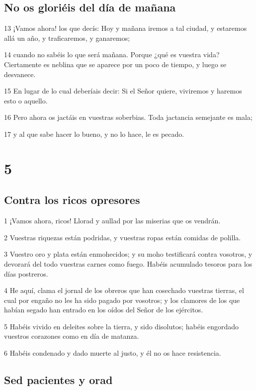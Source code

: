\section*{No os gloriéis del día de mañana}

\par 13 ¡Vamos ahora! los que decís: Hoy y mañana iremos a tal ciudad, y estaremos allá un año, y traficaremos, y ganaremos;
\par 14 cuando no sabéis lo que será mañana. Porque ¿qué es vuestra vida? Ciertamente es neblina que se aparece por un poco de tiempo, y luego se desvanece.
\par 15 En lugar de lo cual deberíais decir: Si el Señor quiere, viviremos y haremos esto o aquello.
\par 16 Pero ahora os jactáis en vuestras soberbias. Toda jactancia semejante es mala;
\par 17 y al que sabe hacer lo bueno, y no lo hace, le es pecado.

\chapter{5}

\section*{Contra los ricos opresores}

\par 1 ¡Vamos ahora, ricos! Llorad y aullad por las miserias que os vendrán.
\par 2 Vuestras riquezas están podridas, y vuestras ropas están comidas de polilla.
\par 3 Vuestro oro y plata están enmohecidos; y su moho testificará contra vosotros, y devorará del todo vuestras carnes como fuego. Habéis acumulado tesoros para los días postreros.
\par 4 He aquí, clama el jornal de los obreros que han cosechado vuestras tierras, el cual por engaño no les ha sido pagado por vosotros; y los clamores de los que habían segado han entrado en los oídos del Señor de los ejércitos.
\par 5 Habéis vivido en deleites sobre la tierra, y sido disolutos; habéis engordado vuestros corazones como en día de matanza.
\par 6 Habéis condenado y dado muerte al justo, y él no os hace resistencia.

\section*{Sed pacientes y orad}

